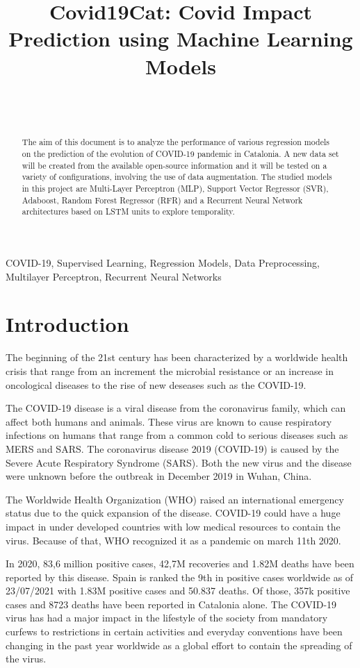 \documentclass[anon]{CI}
\title[Covid19Cat: Covid Impact Prediction using Machine Learning Models]{Covid19Cat: Covid Impact Prediction using Machine Learning Models}
\author{\Name{Victor Badenas} \Email{victor.badenas.crespo@estudiantat.upc.edu}\\
 \Name{Roger Marrugat} \Email{roger.marrugat@estudiantat.upc.edu}\\
 \Name{Laia Seijas} \Email{laia.seijas@estudiantat.upc.edu}
 }
\begin{document}
\sloppy
\maketitle

\begin{abstract}
The aim of this document is to analyze the performance of various regression models on the prediction of the evolution of COVID-19 pandemic in Catalonia. A new data set will be created from the available open-source information and it will be tested on a variety of configurations, involving the use of data augmentation. The studied models in this project are Multi-Layer Perceptron (MLP), Support Vector Regressor (SVR), Adaboost, Random Forest Regressor (RFR) and a Recurrent Neural Network architectures based on LSTM units to explore temporality.
\end{abstract}

\begin{keywords}
COVID-19, Supervised Learning, Regression Models, Data Preprocessing, Multilayer Perceptron, Recurrent Neural Networks
\end{keywords}


\section{Introduction}

The beginning of the 21st century has been characterized by a worldwide health crisis that range from an increment the microbial resistance or an increase in oncological diseases to the rise of new deseases such as the COVID-19. 

The COVID-19 disease is a viral disease from the coronavirus family, which can affect both humans and animals. These virus are known to cause respiratory infections on humans that range from a common cold to serious diseases such as MERS and SARS. The coronavirus disease 2019 (COVID-19) is caused by the Severe Acute Respiratory Syndrome (SARS). Both the new virus and the disease were unknown before the outbreak in December 2019 in Wuhan, China.

The Worldwide Health Organization (WHO) raised an international emergency status due to the quick expansion of the disease. COVID-19 could have a huge impact in under developed countries with low medical resources to contain the virus. Because of that, WHO recognized it as a pandemic on march 11th 2020. 

In 2020, 83,6 million positive cases, 42,7M recoveries and 1.82M deaths have been reported by this disease. Spain is ranked the 9th in positive cases worldwide as of 23/07/2021 \cite{CovidPais} with 1.83M positive cases and 50.837 deaths. Of those, 357k positive cases and 8723 deaths have been reported in Catalonia alone. The COVID-19 virus has had a major impact in the lifestyle of the society from mandatory curfews to restrictions in certain activities and everyday conventions have been changing in the past year worldwide as a global effort to contain the spreading of the virus.
\end{document}
